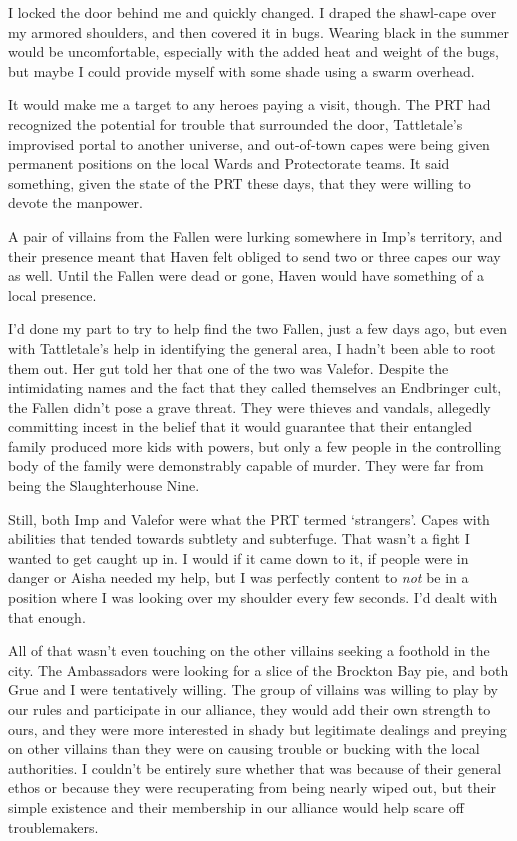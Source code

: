 I locked the door behind me and quickly changed.  I draped the shawl-cape over my armored shoulders, and then covered it in bugs.  Wearing black in the summer would be uncomfortable, especially with the added heat and weight of the bugs, but maybe I could provide myself with some shade using a swarm overhead.



It would make me a target to any heroes paying a visit, though.  The PRT had recognized the potential for trouble that surrounded the door, Tattletale's improvised portal to another universe, and out-of-town capes were being given permanent positions on the local Wards and Protectorate teams. It said something, given the state of the PRT these days, that they were willing to devote the manpower.



A pair of villains from the Fallen were lurking somewhere in Imp's territory, and their presence meant that Haven felt obliged to send two or three capes our way as well.  Until the Fallen were dead or gone, Haven would have something of a local presence.



I'd done my part to try to help find the two Fallen, just a few days ago, but even with Tattletale's help in identifying the general area, I hadn't been able to root them out.  Her gut told her that one of the two was Valefor.  Despite the intimidating names and the fact that they called themselves an Endbringer cult, the Fallen didn't pose a grave threat.  They were thieves and vandals, allegedly committing incest in the belief that it would guarantee that their entangled family produced more kids with powers, but only a few people in the controlling body of the family were demonstrably capable of murder.  They were far from being the Slaughterhouse Nine.



Still, both Imp and Valefor were what the PRT termed `strangers'.  Capes with abilities that tended towards subtlety and subterfuge.  That wasn't a fight I wanted to get caught up in.  I would if it came down to it, if people were in danger or Aisha needed my help, but I was perfectly content to \emph{not} be in a position where I was looking over my shoulder every few seconds.  I'd dealt with that enough.



All of that wasn't even touching on the other villains seeking a foothold in the city.  The Ambassadors were looking for a slice of the Brockton Bay pie, and both Grue and I were tentatively willing.  The group of villains was willing to play by our rules and participate in our alliance, they would add their own strength to ours, and they were more interested in shady but legitimate dealings and preying on other villains than they were on causing trouble or bucking with the local authorities.  I couldn't be entirely sure whether that was because of their general ethos or because they were recuperating from being nearly wiped out, but their simple existence and their membership in our alliance would help scare off troublemakers.



